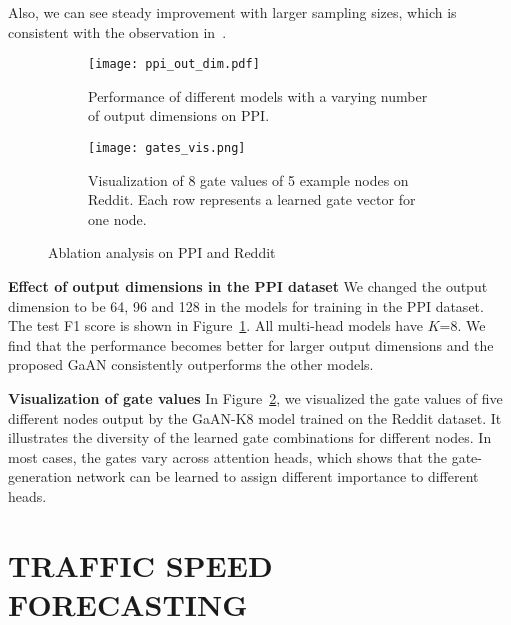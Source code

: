 \documentclass{article}
\begin{document}
	Also, we can see steady improvement with larger sampling sizes, which is consistent with the observation in~\citep{hamilton2017inductive}.
	
	
	\begin{figure}[tb!]
		\centering
		\begin{subfigure}[b]{0.48\textwidth}
			\centering
			\texttt{[image: ppi\_out\_dim.pdf]}
			\caption{Performance of different models with a varying number of output dimensions on PPI.}\label{fig:ppi_out_dim}
		\end{subfigure}
		\begin{subfigure}[b]{0.48\textwidth}
			\centering
			\texttt{[image: gates\_vis.png]}
			\caption{Visualization of 8 gate values of 5 example nodes on Reddit. Each row represents a learned gate vector for one node.}
			\label{fig:gate_vis}
		\end{subfigure}
\caption{Ablation analysis on PPI and Reddit }
		\label{fig:ppi_ablation}
\end{figure}
	
	\textbf{Effect of output dimensions in the PPI dataset}\quad
	We changed the output dimension to be 64, 96 and 128 in the models for training in the PPI dataset. The test F1 score is shown in Figure~\ref{fig:ppi_out_dim}. All multi-head models have $K$=8. We find that the performance becomes better for larger output dimensions and the proposed GaAN consistently outperforms the other models.
	
	\textbf{Visualization of gate values}\quad
	In Figure~\ref{fig:gate_vis}, we visualized the gate values of five different nodes output by the GaAN-K8 model trained on the Reddit dataset. It illustrates the diversity of the learned gate combinations for different nodes. In most cases, the gates vary across attention heads, which shows that the gate-generation network can be learned to assign different importance to different heads.


	
	
	\section{TRAFFIC SPEED FORECASTING}
\end{document}
